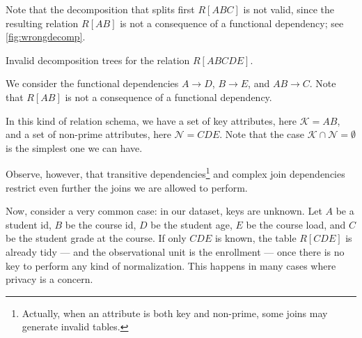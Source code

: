 Note that the decomposition that splits first $R[ABC]$ is not valid, since the resulting
relation $R[AB]$ is not a consequence of a functional dependency; see
\cref{fig:wrongdecomp}.

\begin{figurebox}[label=fig:wrongdecomp]{Invalid decomposition trees for the relation $R[ABCDE]$.}
  \centering
  \tcblower
  We consider the functional dependencies $A \to D$, $B \to E$, and $AB \to C$.
  Note that $R[AB]$ is not a consequence of a functional dependency.
\end{figurebox}

In this kind of relation schema, we have a set of key attributes, here $\mathcal{K} = AB$,
and a set of non-prime attributes, here $\mathcal{N} = CDE$.  Note that the case
$\mathcal{K} \cap \mathcal{N} = \emptyset$ is the simplest one we can have.

Observe, however, that transitive dependencies\footnote{Actually, when an attribute is
both key and non-prime, some joins may generate invalid tables.} and complex join
dependencies restrict even further the joins we are allowed to perform.

Now, consider a very common case: in our dataset, keys are unknown.  Let $A$ be a student
id, $B$ be the course id, $D$ be the student age, $E$ be the course load, and $C$ be the
student grade at the course.  If only $CDE$ is known, the table $R[CDE]$ is already tidy
--- and the observational unit is the enrollment --- once there is no key to perform any
kind of normalization.  This happens in many cases where privacy is a concern.

